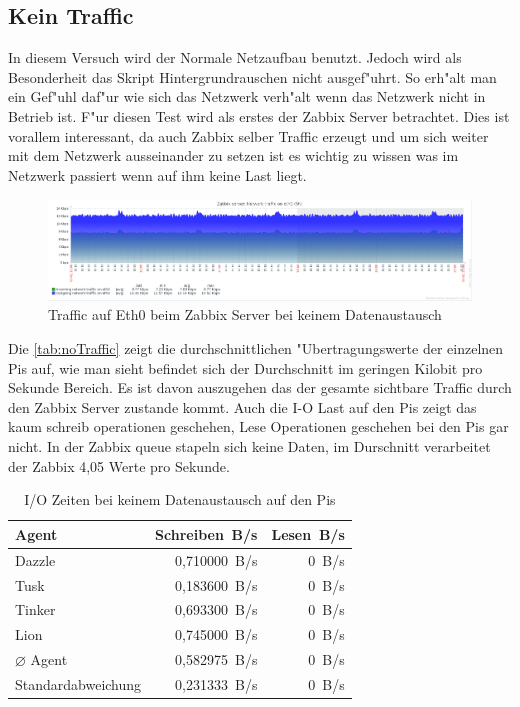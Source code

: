 \subsection{Kein Traffic}
\label{subsec:nix}
In diesem Versuch wird der Normale Netzaufbau benutzt. Jedoch wird als Besonderheit das Skript Hintergrundrauschen %
nicht ausgef"uhrt. So erh"alt man ein Gef"uhl daf"ur wie sich das Netzwerk verh"alt wenn das Netzwerk nicht in Betrieb %
ist. F"ur diesen Test wird als erstes der Zabbix Server betrachtet. Dies ist vorallem interessant, da auch Zabbix selber %
Traffic erzeugt und um sich weiter mit dem Netzwerk ausseinander zu setzen ist es wichtig zu wissen was im Netzwerk passiert %
wenn auf ihm keine Last liegt. %
 
\begin{figure}[htbp]
\centering
\includegraphics*[width=0.9\linewidth]{Abb/Zabbix/ZabbixNoTraffic/ZabbixNoTrafficEth0}

\caption{Traffic auf Eth0 beim Zabbix Server bei keinem Datenaustausch}
\label{fig:Eth0ServerNoTraffic}
\end{figure}

Die \cref{tab:noTraffic} zeigt die durchschnittlichen "Ubertragungswerte der einzelnen Pis auf, wie man sieht %
befindet sich der Durchschnitt im geringen Kilobit pro Sekunde Bereich. Es ist davon auszugehen das der gesamte %
sichtbare Traffic durch den Zabbix Server zustande kommt. Auch die I-O Last auf den Pis zeigt das kaum schreib operationen %
geschehen, Lese Operationen geschehen bei den Pis gar nicht. In der Zabbix queue stapeln sich keine Daten, im Durschnitt %
verarbeitet der Zabbix 4,05 Werte pro Sekunde. 

\begin{table}
\centering
\begin{tabular}{l%
 r<{\,B/s}%
 r<{\,B/s}%
}
Agent	  			& Schreiben	 	& Lesen	\\	
\hline
Dazzle 				& 0,710000		& 0	        \\
Tusk 				& 0,183600		& 0		\\
Tinker				& 0,693300 		& 0	 	\\
Lion				& 0,745000		& 0	 	\\
$\diameter $ Agent 		& 0,582975		& 0		\\   
Standardabweichung 		& 0,231333  		& 0		\\
\end{tabular}
\caption{I/O Zeiten bei keinem Datenaustausch auf den Pis}
\label{tab:noTrafficIoStat}
\end{table}


